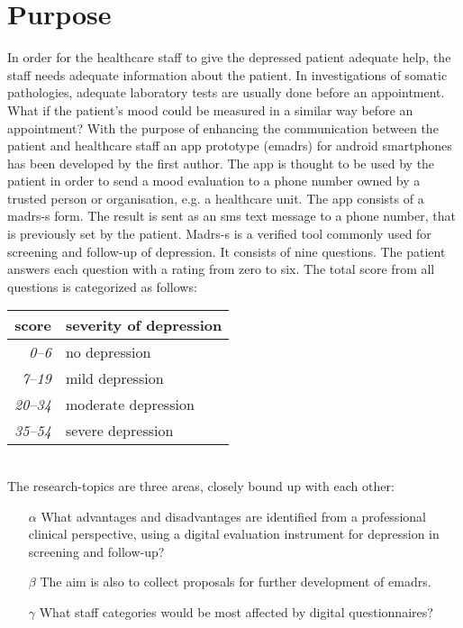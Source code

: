 \documentclass[12pt,a4paper,oneside]{article}
\let\oldcite\cite
\renewcommand*\cite[1]{\textsuperscript{\oldcite{#1}}}
\begin{document}
\section*{Purpose}
In order for the healthcare staff to give the depressed patient adequate help, the staff needs adequate information about the patient. In investigations of somatic pathologies, adequate laboratory tests are usually done before an appointment. What if the patient's mood could be measured in a similar way before an appointment? With the purpose of enhancing the communication between the patient and healthcare staff an app prototype (e{\sc madrs}) for android smartphones has been developed by the first author\cite{emadrs1, emadrs2}. The app is thought to be used by the patient in order to send a mood evaluation to a phone number owned by a trusted person or organisation, e.g. a healthcare unit. The app consists of a {\sc madrs-s} form. The result is sent as an {\sc sms} text message to a phone number, that is previously set by the patient. {\sc Madrs-s} is a verified tool commonly used for screening and follow-up of depression\cite{madrs2,madrs3}. It consists of nine questions. The patient answers each question with a rating from zero to six. The total score from all questions is categorized as follows:\\

\begin{tabular}{r|l}
{\bf score} & {\bf severity of depression}\\
\hline{\it 0--6} &  no depression\\
{\it 7--19} & mild depression\\
{\it 20--34} & moderate depression\\
{\it 35--54} & severe depression\\
\end{tabular}\vspace{1em}
\\The research-topics are three areas, closely bound up with each other:
\begin{itemize}
\item[$\alpha$] What advantages and disadvantages are identified from a professional clinical perspective, using a digital evaluation instrument for depression in screening and follow-up?
\item[$\beta$] The aim is also to collect proposals for further development of e{\sc madrs}.
\item[$\gamma$] What staff categories would be most affected by digital questionnaires?
\end{itemize}
\end{document}
